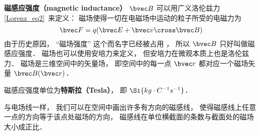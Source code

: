 
\begin{issues}
\issueDraft
\end{issues}


\textbf{磁感应强度（magnetic inductance）} $\bvec B$ 可以用广义洛伦兹力\autoref{Lorenz_eq2}~来定义： 磁场使得一切在电磁场中运动的粒子所受的电磁力为
\begin{equation}
\bvec F = q(\bvec E + \bvec v \cross \bvec B)
\end{equation}
由于历史原因， “磁场强度” 这个而名字已经被占用%
， 所以 $\bvec B$ 只好叫做磁感应强度． 磁场也可以使用安培力来定义， 但安培力在微观本质上也是洛伦兹力． 磁场是三维空间中的矢量场， 即空间中的每一点 $\bvec r$ 都对应一个磁场矢量 $\bvec B(\bvec r)$．




磁感应强度单位为\textbf{特斯拉（Tesla）}， 即 $\Si{kg\cdot C^{-1}s^{-1}}$．

与电场线一样， 我们可以在空间中画出许多有方向的磁感线， 使得磁感线上任意一点的方向等于该点处磁场的方向， 磁感线在单位横截面的条数与截面处的磁场大小成正比．
